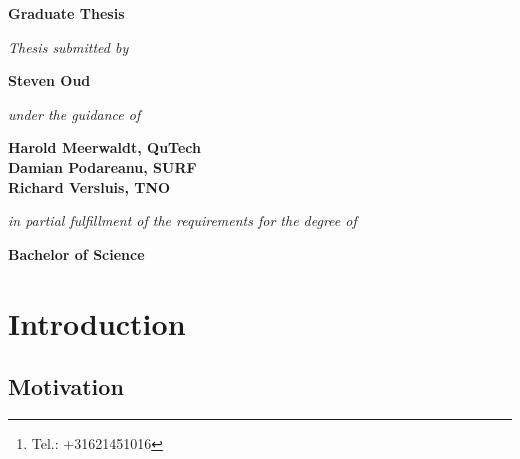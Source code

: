 \documentclass[a4paper,10pt]{report}
\title{\thesistitle}
\author{\authorname\thanks{Tel.: +31621451016}\\
    500776959\\
    \\
    Amsterdam University of Applied Sciences\\
    \emph{Faculty of Computer Science, Information Technology,}\\
    \emph{Business IT and Management}\\
    Software Engineering
    \\
    \\
    Advisor: Marten Teitsma}
\date{\today}
\newcommand{\thesistitle}{Graduate Thesis}
\newcommand{\authorname}{Steven Oud}
\begin{document}
\begin{titlepage}
\thispagestyle{empty}
    \begin{center}
        \vspace*{1cm}
        \textbf{\LARGE \thesistitle}
        
        \vspace{1.5cm}
        \textit{\large Thesis submitted by}

        \vspace{0.75cm}
        
        \textbf{\large \authorname}
        
        \vspace{0.75cm}
        \textit{\large under the guidance of}
        
        \vspace{0.75cm}
        \textbf{\large Harold Meerwaldt, QuTech\\
            Damian Podareanu, SURF\\
            Richard Versluis, TNO}
        
        \vspace{0.75cm}
        \textit{\large in partial fulfillment of the requirements for the degree of}
        
        \vspace{0.75cm}
        \textbf{\large Bachelor of Science}
        
    \end{center}
\end{titlepage}


\maketitle

\begin{abstract}
    \lipsum[5]
\end{abstract}

\cleardoublepage
\tableofcontents

\cleardoublepage
\listoffigures

\cleardoublepage
\listoftables

\cleardoublepage
{}

\chapter{Introduction}
\lipsum[1]
\section{Motivation}
\lipsum[1]
\end{document}
